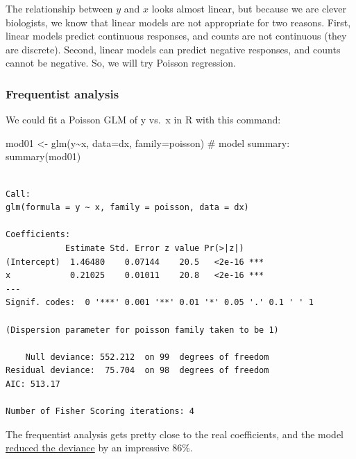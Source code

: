 \documentclass[
  13,
  letterpaper,
]{report}
\newenvironment{Shaded}{\begin{snugshade}}{\end{snugshade}}
\newcommand{\AttributeTok}[1]{\textcolor[rgb]{0.40,0.45,0.13}{#1}}
\newcommand{\CommentTok}[1]{\textcolor[rgb]{0.37,0.37,0.37}{#1}}
\newcommand{\DecValTok}[1]{\textcolor[rgb]{0.68,0.00,0.00}{#1}}
\newcommand{\FunctionTok}[1]{\textcolor[rgb]{0.28,0.35,0.67}{#1}}
\newcommand{\NormalTok}[1]{\textcolor[rgb]{0.00,0.23,0.31}{#1}}
\newcommand{\OtherTok}[1]{\textcolor[rgb]{0.00,0.23,0.31}{#1}}
\newcommand{\SpecialCharTok}[1]{\textcolor[rgb]{0.37,0.37,0.37}{#1}}
\begin{document}
The relationship between \(y\) and \(x\) looks almost linear, but
because we are clever biologists, we know that linear models are not
appropriate for two reasons. First, linear models predict continuous
responses, and counts are not continuous (they are discrete). Second,
linear models can predict negative responses, and counts cannot be
negative. So, we will try Poisson regression.

\subsubsection{Frequentist analysis}\label{sec-glm1-pois-ex-freq}

We could fit a Poisson GLM of y vs.~x in R with this command:

\begin{Shaded}
\begin{Highlighting}[]
\NormalTok{mod01 }\OtherTok{\textless{}{-}} \FunctionTok{glm}\NormalTok{(y}\SpecialCharTok{\textasciitilde{}}\NormalTok{x, }\AttributeTok{data=}\NormalTok{dx, }\AttributeTok{family=}\NormalTok{poisson)}
\CommentTok{\# model summary:}
\FunctionTok{summary}\NormalTok{(mod01)}
\end{Highlighting}
\end{Shaded}

\begin{verbatim}

Call:
glm(formula = y ~ x, family = poisson, data = dx)

Coefficients:
            Estimate Std. Error z value Pr(>|z|)    
(Intercept)  1.46480    0.07144    20.5   <2e-16 ***
x            0.21025    0.01011    20.8   <2e-16 ***
---
Signif. codes:  0 '***' 0.001 '**' 0.01 '*' 0.05 '.' 0.1 ' ' 1

(Dispersion parameter for poisson family taken to be 1)

    Null deviance: 552.212  on 99  degrees of freedom
Residual deviance:  75.704  on 98  degrees of freedom
AIC: 513.17

Number of Fisher Scoring iterations: 4
\end{verbatim}

The frequentist analysis gets pretty close to the real coefficients, and
the model
\href{https://greenquanteco.github.io/appl-biol-data-analysis/chapters/ch18.html\#sec-glm1-lik-pseudo}{reduced
the deviance} by an impressive 86\%.

\begin{Shaded}
\end{Shaded}
\end{document}
